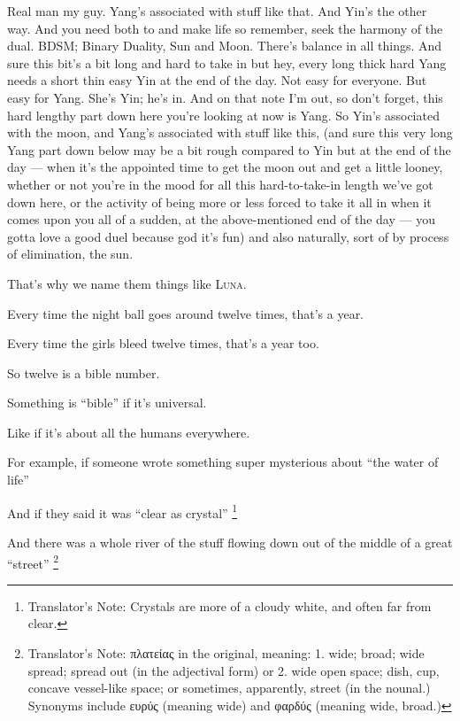 {{{		Real man  my guy.
		Yang's associated with stuff like that.
		And Yin's the other way.
		And you need both to  and make life
		so remember, seek the harmony of the dual.
		BDSM; Binary Duality, Sun and Moon. There's balance in all things.
		And sure this bit's a bit long and hard to take in but hey,
		every long thick hard Yang needs a short thin easy Yin at the end of the day.
		Not easy for everyone. But easy for Yang. She's Yin; he's in.
		And on that note I'm out, so don't forget,
		this hard lengthy part down here you're looking at now is Yang.
		So Yin's associated with the moon, and Yang's associated with stuff
		like this, (and sure this very long Yang part
		down below may be a bit rough compared to Yin but at the end of the day ---
		when it's the appointed time to get the moon out and get a little looney,
		whether or not you're in the mood for all this hard-to-take-in length
		we've got down here, or the activity of being more or less forced to
		take it all in when it comes upon you all of a sudden,
		at the above-mentioned end of the day --- you gotta love a good duel because god
		 it's fun)
		and also naturally, sort of by process of elimination, the sun.
		}

		That's why we name them things like \textsc{Luna}.

		Every time the night ball goes around twelve times, that's a year.

		Every time the girls bleed twelve times, that's a year too.

		So twelve is a bible number.

		Something is ``bible'' if it's universal.

		Like if it's about all the humans everywhere.

		For example, if someone wrote something super mysterious about ``the water of life''

		And if they said it was ``clear as crystal''%
		\footnote{Translator's Note: Crystals are more of a cloudy white, and often far from clear.}%

		And there was a whole river of the stuff flowing down out of the middle of a great ``street''
		\footnote{
			Translator's Note: πλατείας in the original, meaning:
			1. wide; broad; wide spread; spread out (in the adjectival form) or
			2. wide open space; dish, cup, concave vessel-like space; or sometimes, apparently, street (in the nounal.)
			Synonyms include ευρύς (meaning wide) and φαρδύς (meaning wide, broad.)
		}%

}}
